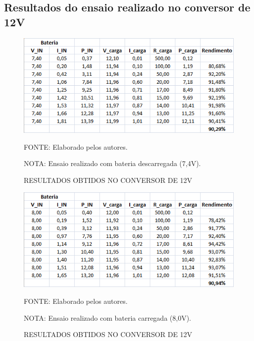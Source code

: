 \documentclass[
	12pt,				%
	openright,			%
	oneside,			%
	a4paper,			%
	english,			%
	french,				%
	spanish,			%
	brazil,				%
	oldfontcommands
	]{abntex2}
\begin{document}
\begin{apendicesenv}
\chapter[Resultados do ensaio realizado no conversor de 12V]{Resultados do ensaio realizado no conversor de 12V}\label{An_rend12}

	\begin{figure}[th]
		\caption{RESULTADOS OBTIDOS NO CONVERSOR DE 12V}
		\centering
		\includegraphics[width=0.75\linewidth]{./anexos/rend12_1}
		
		\begin{small}
			FONTE: Elaborado pelos autores.
		\end{small}	
		
		\begin{footnotesize}
		NOTA: Ensaio realizado com bateria descarregada (7,4V).
		\end{footnotesize}
	\end{figure}
	
	\begin{figure}[th]
		\caption{RESULTADOS OBTIDOS NO CONVERSOR DE 12V}
		\centering
		\includegraphics[width=0.75\linewidth]{./anexos/rend12_2}
		
		\begin{small}
			FONTE: Elaborado pelos autores.
		\end{small}	
		
		\begin{footnotesize}
		NOTA: Ensaio realizado com bateria carregada (8,0V).
		\end{footnotesize}
	\end{figure}
	

\end{apendicesenv}
\end{document}
